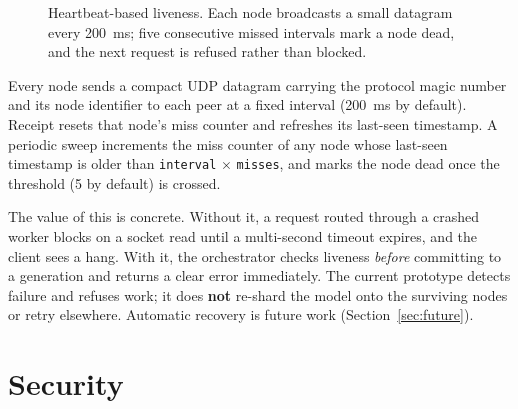 \documentclass[11pt,a4paper]{article}
\begin{document}
\begin{figure}[h]
\centering
{}
\caption{Heartbeat-based liveness. Each node broadcasts a small datagram every
200~ms; five consecutive missed intervals mark a node dead, and the next request
is refused rather than blocked.}
\label{fig:hb}
\end{figure}

Every node sends a compact UDP datagram carrying the protocol magic number and
its node identifier to each peer at a fixed interval (200~ms by default). Receipt
resets that node's miss counter and refreshes its last-seen timestamp. A periodic
sweep increments the miss counter of any node whose last-seen timestamp is older
than \texttt{interval} $\times$ \texttt{misses}, and marks the node dead once the
threshold (5 by default) is crossed.

The value of this is concrete. Without it, a request routed through a crashed
worker blocks on a socket read until a multi-second timeout expires, and the
client sees a hang. With it, the orchestrator checks liveness \emph{before}
committing to a generation and returns a clear error immediately. The current
prototype detects failure and refuses work; it does \textbf{not} re-shard the
model onto the surviving nodes or retry elsewhere. Automatic recovery is future
work (Section~\ref{sec:future}).

\section{Security}
\end{document}
